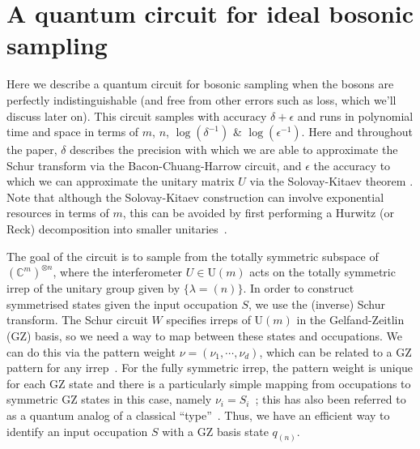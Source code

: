 \section{A quantum circuit for ideal bosonic sampling}
\label{sec:qc-bs}

Here we describe a quantum circuit for bosonic sampling when the bosons are perfectly indistinguishable (and free from other errors such as loss, which we'll discuss later on). 
This circuit samples with accuracy $\delta + \epsilon$ and runs in polynomial time and space in terms of $m$, $n$, $\log(\delta^{-1})$ \& $\log(\epsilon^{-1})$. 
Here and throughout the paper, $\delta$ describes the precision with which we are able to approximate the Schur transform via the Bacon-Chuang-Harrow circuit, and $\epsilon$ the accuracy to which we can approximate the unitary matrix $U$ via the Solovay-Kitaev theorem \cite{nielsen2010,dawson2006}.
Note that although the Solovay-Kitaev construction can involve exponential resources in terms of $m$, this can be avoided by first performing a Hurwitz (or Reck) decomposition into smaller unitaries~\cite{hurwitz1897, reck1994, barenco1995}.

The goal of the circuit is to sample from the totally symmetric subspace of $(\mathbb{C}^m)^{\otimes n}$, where the interferometer $U \in \textrm{U}(m)$ acts on the totally symmetric irrep of the unitary group given by $\{ \lambda = (n)\}$.
In order to construct symmetrised states given the input occupation $S$, we use the (inverse) Schur transform. 
The Schur circuit $W$ specifies irreps of U$(m)$ in the Gelfand-Zeitlin (GZ) basis, so we need a way to map between these states and occupations. 
We can do this via the pattern weight $\nu = (\nu_1,\cdots,\nu_d)$, which can be related to a GZ pattern for any irrep~\cite{alex2011}. 
For the fully symmetric irrep, the pattern weight is unique for each GZ state and there is a particularly simple mapping from occupations to symmetric GZ states in this case, namely $\nu_i = S_i$~\cite{rowe1999}; this has also been referred to as a quantum analog of a classical ``type''~\cite{harrow2005}.
Thus, we have an efficient way to identify an input occupation $S$ with a GZ basis state $q_{(n)}$.

